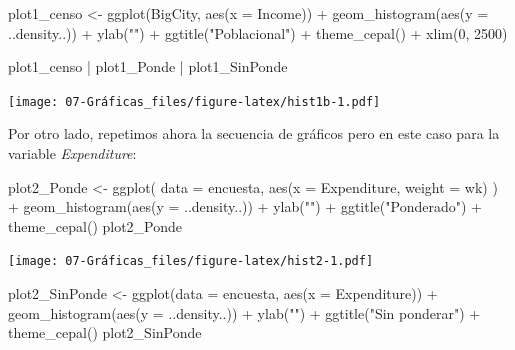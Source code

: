 \documentclass[
  12pt,
]{book}
\newenvironment{Shaded}{\begin{snugshade}}{\end{snugshade}}
\newcommand{\AttributeTok}[1]{\textcolor[rgb]{0.77,0.63,0.00}{#1}}
\newcommand{\DecValTok}[1]{\textcolor[rgb]{0.00,0.00,0.81}{#1}}
\newcommand{\FunctionTok}[1]{\textcolor[rgb]{0.00,0.00,0.00}{#1}}
\newcommand{\NormalTok}[1]{#1}
\newcommand{\OtherTok}[1]{\textcolor[rgb]{0.56,0.35,0.01}{#1}}
\newcommand{\SpecialCharTok}[1]{\textcolor[rgb]{0.00,0.00,0.00}{#1}}
\newcommand{\StringTok}[1]{\textcolor[rgb]{0.31,0.60,0.02}{#1}}
\begin{document}
\begin{Shaded}
\begin{Highlighting}[]
\NormalTok{plot1\_censo }\OtherTok{\textless{}{-}} \FunctionTok{ggplot}\NormalTok{(BigCity, }\FunctionTok{aes}\NormalTok{(}\AttributeTok{x =}\NormalTok{ Income)) }\SpecialCharTok{+}
  \FunctionTok{geom\_histogram}\NormalTok{(}\FunctionTok{aes}\NormalTok{(}\AttributeTok{y =}\NormalTok{ ..density..)) }\SpecialCharTok{+}
  \FunctionTok{ylab}\NormalTok{(}\StringTok{""}\NormalTok{) }\SpecialCharTok{+}
  \FunctionTok{ggtitle}\NormalTok{(}\StringTok{"Poblacional"}\NormalTok{) }\SpecialCharTok{+}
  \FunctionTok{theme\_cepal}\NormalTok{() }\SpecialCharTok{+}
  \FunctionTok{xlim}\NormalTok{(}\DecValTok{0}\NormalTok{, }\DecValTok{2500}\NormalTok{)}

\NormalTok{plot1\_censo }\SpecialCharTok{|}\NormalTok{ plot1\_Ponde }\SpecialCharTok{|}\NormalTok{ plot1\_SinPonde}
\end{Highlighting}
\end{Shaded}

\texttt{[image: 07-Gráficas\_files/figure-latex/hist1b-1.pdf]}

Por otro lado, repetimos ahora la secuencia de gráficos pero en este caso para la variable \emph{Expenditure}:

\begin{Shaded}
\begin{Highlighting}[]
\NormalTok{plot2\_Ponde }\OtherTok{\textless{}{-}} \FunctionTok{ggplot}\NormalTok{(}
  \AttributeTok{data =}\NormalTok{  encuesta,}
  \FunctionTok{aes}\NormalTok{(}\AttributeTok{x =}\NormalTok{ Expenditure, }\AttributeTok{weight =}\NormalTok{ wk)}
\NormalTok{) }\SpecialCharTok{+}
  \FunctionTok{geom\_histogram}\NormalTok{(}\FunctionTok{aes}\NormalTok{(}\AttributeTok{y =}\NormalTok{ ..density..)) }\SpecialCharTok{+}
  \FunctionTok{ylab}\NormalTok{(}\StringTok{""}\NormalTok{) }\SpecialCharTok{+}
  \FunctionTok{ggtitle}\NormalTok{(}\StringTok{"Ponderado"}\NormalTok{) }\SpecialCharTok{+}
  \FunctionTok{theme\_cepal}\NormalTok{()}
\NormalTok{plot2\_Ponde}
\end{Highlighting}
\end{Shaded}

\texttt{[image: 07-Gráficas\_files/figure-latex/hist2-1.pdf]}

\begin{Shaded}
\begin{Highlighting}[]
\NormalTok{plot2\_SinPonde }\OtherTok{\textless{}{-}} \FunctionTok{ggplot}\NormalTok{(}\AttributeTok{data =}\NormalTok{ encuesta,}
      \FunctionTok{aes}\NormalTok{(}\AttributeTok{x =}\NormalTok{ Expenditure)) }\SpecialCharTok{+}
      \FunctionTok{geom\_histogram}\NormalTok{(}\FunctionTok{aes}\NormalTok{(}\AttributeTok{y =}\NormalTok{ ..density..)) }\SpecialCharTok{+}
      \FunctionTok{ylab}\NormalTok{(}\StringTok{""}\NormalTok{) }\SpecialCharTok{+}
      \FunctionTok{ggtitle}\NormalTok{(}\StringTok{"Sin ponderar"}\NormalTok{) }\SpecialCharTok{+}
      \FunctionTok{theme\_cepal}\NormalTok{()}
\NormalTok{plot2\_SinPonde}
\end{Highlighting}
\end{Shaded}
\end{document}
